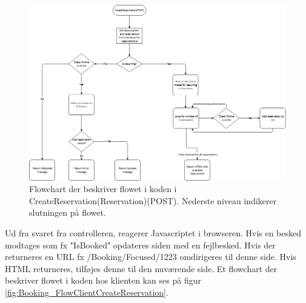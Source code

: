 \begin{figure}[H]
  \includegraphics[width=\linewidth]{01_Billeder/10_Design_og_implementering/Booking/Flowchart_ServerCreateReservation.jpg}
  \centering
  \caption{Flowchart der beskriver flowet i koden i CreateReservation(Reservation)(POST). Nederste niveau indikerer slutningen på flowet.}
  \label{fig:Booking_FlowCreateReservation}
\end{figure}


Ud fra svaret fra controlleren, reagerer Javascriptet i browseren. Hvis en besked modtages som fx "IsBooked" opdateres siden med en fejlbesked. Hvis der returneres en URL fx /Booking/Focused/1223 omdirigeres til denne side. Hvis HTML returneres, tilføjes denne til den nuværende side. Et flowchart der beskriver flowet i koden hos klienten kan ses på figur \ref{fig:Booking_FlowClientCreateReservation}.  

